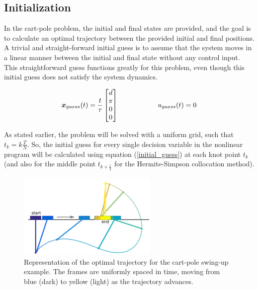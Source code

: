 \documentclass{thesisreport}
\begin{document}
\newpage

\subsection{Initialization}

In the cart-pole problem, the initial and final states are provided, and the goal is to calculate an optimal trajectory between the provided initial and final positions. A trivial and straight-forward initial guess is to assume that the system moves in a linear manner between the initial and final state without any control input. This straightforward guess functions greatly for this problem, even though this initial guess does not satisfy the system dynamics.

\begin{equation}\label{initial_guess}
\bm{x}_{guess}(t) =\frac{t}{\tau} \begin{bmatrix}
d \\
\pi \\
0 \\
0 \\
\end{bmatrix} \text{\hspace{2cm}} u_{guess}(t)=0
\end{equation}


As stated earlier, the problem will be solved with a uniform grid, such that $t_k = k \frac{T}{N}$.  So, the initial guess for every single decision variable in the nonlinear program will be calculated using equation (\ref{initial_guess}) at each knot point $t_k$ (and also for the middle point $t_{k+\frac{1}{2}}$ for the Hermite-Simpson collocation method).

\begin{figure}[h]
\centering
\includegraphics[width=0.6\textwidth]{Images/Trajectory/cart_pole_solved}
\caption{Representation of the optimal trajectory for the cart-pole swing-up example. The frames are uniformly spaced in time, moving from blue (dark) to yellow (light) as the trajectory advances\cite{Kelly2017}. }
\label{trajectory_problem_solution_a}
\end{figure}
\end{document}
